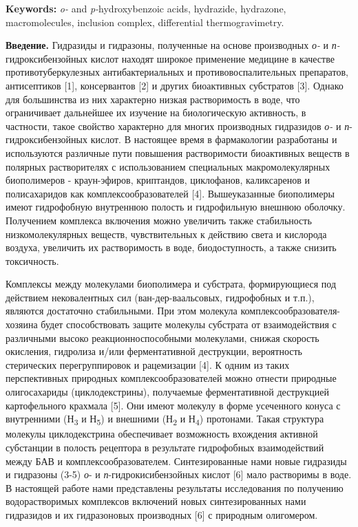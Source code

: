 {\bfseries Keywords:} \emph{o-} and \emph{p-}hydroxybenzoic acids,
hydrazide, hydrazone, macromolecules, inclusion complex, differential
thermogravimetry.

{\bfseries Введение.} Гидразиды и гидразоны, полученные на основе
производных \emph{о-} и \emph{п-}гидроксибензойных кислот находят
широкое применение медицине в качестве противотуберкулезных
антибактериальных и противовоспалительных препаратов, антисептиков
{[}1{]}, консервантов {[}2{]} и других биоактивных субстратов {[}3{]}.
Однако для большинства из них характерно низкая растворимость в воде,
что ограничивает дальнейшее их изучение на биологическую активность, в
частности, такое свойство характерно для многих производных гидразидов
\emph{о-} и \emph{п}-гидроксибензойных кислот. В настоящее время в
фармакологии разработаны и используются различные пути повышения
растворимости биоактивных веществ в полярных растворителях с
использованием специальных макромолекулярных биополимеров -
краун-эфиров, криптандов, циклофанов, каликсаренов и полисахаридов как
комплексообразователей {[}4{]}. Вышеуказанные биополимеры имеют
гидрофобную внутреннюю полость и гидрофильную внешнюю оболочку.
Получением комплекса включения можно увеличить также стабильность
низкомолекулярных веществ, чувствительных к действию света и кислорода
воздуха, увеличить их растворимость в воде, биодоступность, а также
снизить токсичность.

Комплексы между молекулами биополимера и субстрата, формирующиеся под
действием нековалентных сил (ван-дер-ваальсовых, гидрофобных и т.п.),
являются достаточно стабильными. При этом молекула
комплексообразователя-хозяина будет способствовать защите молекулы
субстрата от взаимодействия с различными высоко реакционноспособными
молекулами, снижая скорость окисления, гидролиза и/или ферментативной
деструкции, вероятность стерических перегруппировок и рацемизации
{[}4{]}. К одним из таких перспективных природных комплексообразователей
можно отнести природные олигосахариды (циклодекстрины), получаемые
ферментативной деструкцией картофельного крахмала {[}5{]}. Они имеют
молекулу в форме усеченного конуса с внутренними (Н\textsubscript{3} и
Н\textsubscript{5}) и внешними (Н\textsubscript{2} и Н\textsubscript{4})
протонами. Такая структура молекулы циклодекстрина обеспечивает
возможность вхождения активной субстанции в полость рецептора в
результате гидрофобных взаимодействий между БАВ и
комплексообразователем. Синтезированные нами новые гидразиды и гидразоны
(3-5) \emph{о}- и \emph{п}-гидрокисибензойных кислот {[}6{]} мало
растворимы в воде. В настоящей работе нами представлены результаты
исследования по получению водорастворимых комплексов включений новых
синтезированных нами гидразидов и их гидразоновых производных {[}6{]} с
природным олигомером.

